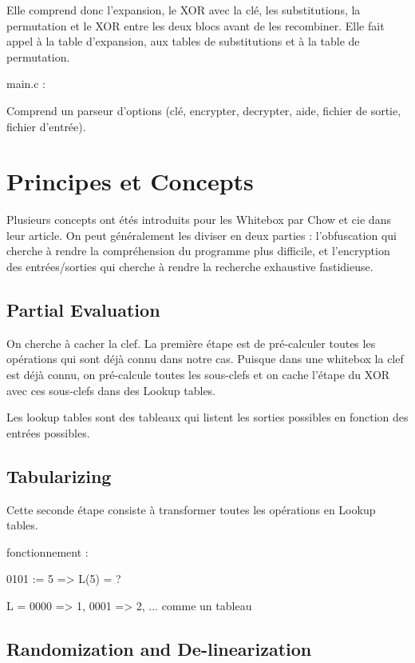 \documentclass[a4paper,12pt]{article}
\begin{document}
Elle comprend donc l'expansion, le XOR avec la clé, les substitutions, la permutation et le XOR entre les deux blocs avant de les recombiner. Elle fait appel à la table d'expansion, aux tables de substitutions et à la table de permutation.

main.c :

	Comprend un parseur d'options (clé, encrypter, decrypter, aide, fichier de sortie, fichier d'entrée).


\newpage

\section{Principes et Concepts}

Plusieurs concepts ont étés introduits pour les Whitebox par Chow et cie dans leur article. On peut généralement les diviser en deux parties : l'obfuscation qui cherche à rendre la compréhension du programme plus difficile, et
 l'encryption des entrées/sorties qui cherche à rendre la recherche exhaustive fastidieuse.

\subsection{Partial Evaluation}

On cherche à cacher la clef. La première étape est de pré-calculer toutes les opérations qui sont déjà connu dans notre cas. Puisque dans une whitebox la clef est déjà connu, on pré-calcule toutes les sous-clefs et on cache l'étape du XOR avec ces sous-clefs dans des Lookup tables.

Les lookup tables sont des tableaux qui listent les sorties possibles en fonction des entrées possibles.

\subsection{Tabularizing}

Cette seconde étape consiste à transformer toutes les opérations en Lookup tables.

fonctionnement :

0101 := 5 => L(5) = ?

L = { 0000 => 1, 0001 => 2, ... } comme un tableau

\subsection{Randomization and De-linearization}
\end{document}
